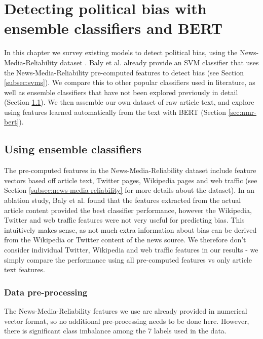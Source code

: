 \chapter{Detecting political bias with ensemble classifiers and BERT} \label{chap:ensemble-bert}

In this chapter we survey existing models to detect political bias, using the News-Media-Reliability dataset \cite{news-media-reliability}. Baly et al. already provide an SVM classifier that uses the News-Media-Reliability pre-computed features to detect bias (see Section \ref{subsec:svms}). We compare this to other popular classifiers used in literature, as well as ensemble classifiers that have not been explored previously in detail (Section \ref{sec:nmr-ensemble}). We then assemble our own dataset of raw article text, and explore using features learned automatically from the text with BERT (Section \ref{sec:nmr-bert}).

\section{Using ensemble classifiers} \label{sec:nmr-ensemble}

The pre-computed features in the News-Media-Reliability dataset include feature vectors based off article text, Twitter pages, Wikipedia pages and web traffic (see Section \ref{subsec:news-media-reliability} for more details about the dataset). In an ablation study, Baly et al. found that the features extracted from the actual article content provided the best classifier performance, however the Wikipedia, Twitter and web traffic features were not very useful for predicting bias. This intuitively makes sense, as not much extra information about bias can be derived from the Wikipedia or Twitter content of the news source. We therefore don't consider individual Twitter, Wikipedia and web traffic features in our results - we simply compare the performance using all pre-computed features vs only article text features.

\subsection{Data pre-processing}

The News-Media-Reliability features we use are already provided in numerical vector format, so no additional pre-processing needs to be done here. However, there is significant class imbalance among the 7 labels used in the data.

